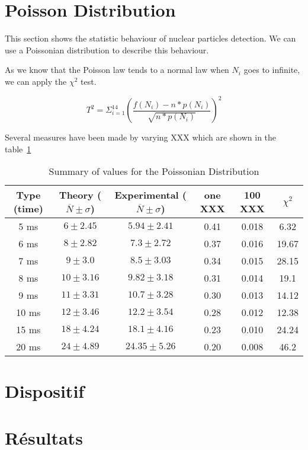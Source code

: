\documentclass[a4paper,12pt,oneside]{article}
\begin{document}
\section{Poisson Distribution}

This section shows the statistic behaviour of nuclear particles detection. We can use a Poissonian distribution to describe this behaviour.

As we know that the Poisson law tends to a normal law when $N_i$ goes to infinite, we can apply the $\chi^2$ test.

$$T^2=\Sigma^{14}_{i=1}{\left(\frac{f(N_i)-n*p(N_i)}{\sqrt{n*p(N_i)}}\right)^2}$$

Several measures have been made by varying XXX which are shown in the table~\ref{tab:poisson}


\begin{table}
\centering
	\begin{tabular}{|c|c|c|c|c|c|}
	   \hline
	   Type (time) & Theory ($\overline{N}\pm\sigma$)& Experimental ($\overline{N}\pm\sigma$) & one XXX & 100 XXX & $\chi^2$ \\
		\hline
	   5 ms & $6\pm 2.45$ & $5.94\pm 2.41$ & 0.41 & 0.018 & 6.32\\
	   6 ms & $8\pm 2.82$ & $7.3\pm 2.72$ & 0.37 & 0.016 & 19.67\\
	   7 ms & $9\pm 3.0$ & $8.5\pm 3.03$ & 0.34 & 0.015 & 28.15\\
	   8 ms & $10\pm 3.16$ & $9.82\pm 3.18$ & 0.31 & 0.014 & 19.1\\
	   9 ms & $11\pm 3.31$ & $10.7\pm 3.28$ & 0.30 & 0.013 & 14.12\\
	   10 ms & $12\pm 3.46$ & $12.2\pm 3.54$ & 0.28 & 0.012 & 12.38\\
	   15 ms & $18\pm 4.24$ & $18.1\pm 4.16$ & 0.23 & 0.010 & 24.24\\
	   20 ms & $24\pm 4.89$ & $24.35\pm 5.26$ & 0.20 & 0.008 & 46.2\\
		\hline
	\end{tabular}
	\caption{Summary of values for the Poissonian Distribution}
	\label{tab:poisson}
\end{table}

\section{Dispositif}


\section{Résultats}
\end{document}
